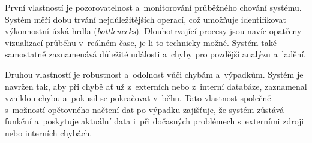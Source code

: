 První vlastností je pozorovatelnost a~monitorování průběžného chování systému. Systém měří dobu trvání nejdůležitějších operací, což umožňuje identifikovat výkonnostní úzká hrdla (\textit{bottlenecks}). Dlouhotrvající procesy jsou navíc opatřeny vizualizací průběhu v~reálném čase, je-li to technicky možné. Systém také samostatně zaznamenává důležité události a~chyby pro pozdější analýzu a~ladění.

Druhou vlastností je robustnost a~odolnost vůči chybám a~výpadkům. Systém je navržen tak, aby při chybě ať už z~externích \API nebo z~interní databáze, zaznamenal vzniklou chybu a~pokusil se pokračovat v~běhu. Tato vlastnost společně s~možností opětovného načtení dat po výpadku zajišťuje, že systém zůstává funkční a~poskytuje aktuální data i~při dočasných problémech s~externími zdroji nebo interních chybách.
